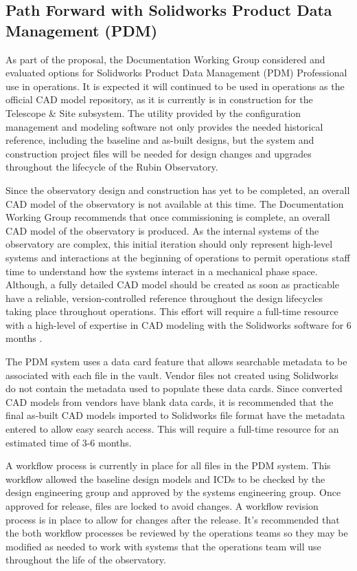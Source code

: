 \subsection{Path Forward with Solidworks Product Data Management (PDM)}
\label{sec:pdm-path}

As part of the proposal, the Documentation Working Group considered and evaluated options for Solidworks Product Data Management (PDM) Professional \citep{PDM-cite} use in operations.
It is expected it will continued to be used in operations as the official CAD model repository, as it is currently is in construction for the Telescope \& Site subsystem.
The utility provided by the configuration management and modeling software not only provides the needed historical reference, including the baseline and as-built designs, but the system and construction project files will be needed for design changes and upgrades throughout the lifecycle of the Rubin Observatory.

Since the observatory design and construction has yet to be completed, an overall CAD model of the observatory is not available at this time.
The Documentation Working Group recommends that once commissioning is complete, an overall CAD model of the observatory is produced.
As the internal systems of the observatory are complex, this initial iteration should only represent high-level systems and interactions at the beginning of operations to permit operations staff time to understand how the systems interact in a mechanical phase space.
Although, a fully detailed CAD model should be created as soon as practicable have a reliable, version-controlled reference throughout the design lifecycles taking place throughout operations.
This effort will require a full-time resource with a high-level of expertise in CAD modeling with the Solidworks software for $6$ months .

The PDM system uses a data card feature that allows searchable metadata to be associated with each file in the vault.
Vendor files not created using Solidworks do not contain the metadata used to populate these data cards.
Since converted CAD models from vendors have blank data cards, it is recommended that the final as-built CAD models imported to Solidworks file format have the metadata entered to allow easy search access.
This will require a full-time resource for an estimated time of $3$-$6$ months.

A workflow process is currently in place for all files in the PDM system.
This workflow allowed the baseline design models and ICDs to be checked by the design engineering group and approved by the systems engineering group.
Once approved for release, files are locked to avoid changes.
A workflow revision process is in place to allow for changes after the release.
It's recommended that the both workflow processes be reviewed by the operations teams so they may be modified as needed to work with systems that the operations team will use throughout the life of the observatory.

